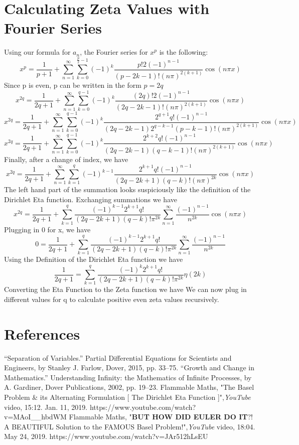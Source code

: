 \documentclass[12pt]{article}
\begin{document}
\section{Calculating Zeta Values with Fourier Series}
Using our formula for \(a_n\), the Fourier series for \(x^p\) is the following:
\[x^p=\frac{1}{p+1}+\sum_{n=1}^{\infty}\sum_{k=0}^{\frac{p}{2}-1}(-1)^k\frac{p!2(-1)^{n-1}}{(p-2k-1)!(n\pi)^{2(k+1)}}\cos(n\pi x)\]
Since p is even, p can be written in the form \(p=2q\)
\[x^{2q}=\frac{1}{2q+1}+\sum_{n=1}^{\infty}\sum_{k=0}^{q-1}(-1)^k\frac{(2q)!2(-1)^{n-1}}{(2q-2k-1)!(n\pi)^{2(k+1)}}\cos(n\pi x)\]
\[x^{2q}=\frac{1}{2q+1}+\sum_{n=1}^{\infty}\sum_{k=0}^{q-1}(-1)^k\frac{2^{q+1}q!(-1)^{n-1}}{(2q-2k-1)2^{q-k-1}(p-k-1)!(n\pi)^{2(k+1)}}\cos(n\pi x)\]
\[x^{2q}=\frac{1}{2q+1}+\sum_{n=1}^{\infty}\sum_{k=0}^{q-1}(-1)^k\frac{2^{k+2}q!(-1)^{n-1}}{(2q-2k-1)(q-k-1)!(n\pi)^{2(k+1)}}\cos(n\pi x)\]
Finally, after a change of index, we have
\[{x^{2q}=\frac{1}{2q+1}+\sum_{n=1}^{\infty}\sum_{k=1}^q(-1)^{k-1}\frac{2^{k+1}q!(-1)^{n-1}}{(2q-2k+1)(q-k)!(n\pi)^{2k}}\cos(n\pi x)}\]
The left hand part of the summation looks suspiciously like the definition of the Dirichlet Eta function.
Exchanging summations we have
\[x^{2q}=\frac{1}{2q+1}+\sum_{k=1}^q\frac{(-1)^{k-1}2^{k+1}q!}{(2q-2k+1)(q-k)!\pi^{2k}}\sum_{n=1}^{\infty}\frac{(-1)^{n-1}}{n^{2k}}\cos(n\pi x)\]
Plugging in 0 for x, we have
\[0=\frac{1}{2q+1}+\sum_{k=1}^q\frac{(-1)^{k-1}2^{k+1}q!}{(2q-2k+1)(q-k)!\pi^{2k}}\sum_{n=1}^{\infty}\frac{(-1)^{n-1}}{n^{2k}}\]
Using the Definition of the Dirichlet Eta function we have
\[\frac{1}{2q+1}=\sum_{k=1}^q\frac{(-1)^{k}2^{k+1}q!}{(2q-2k+1)(q-k)!\pi^{2k}}\eta(2k)\]
Converting the Eta Function to the Zeta function we have
\newline
{} \newline
\newline
We can now plug in different values for q to calculate positive even zeta values recursively.
\newpage
\section{References}
“Separation of Variables.” Partial Differential Equations for Scientists and Engineers, by Stanley J. Farlow, Dover, 2015, pp. 33–75.
\newline
\newline“Growth and Change in Mathematics.” Understanding Infinity: the Mathematics of Infinite Processes, by A. Gardiner, Dover Publications, 2002, pp. 19–23.
\newline
\newline
Flammable Maths, "The Basel Problem \& its Alternating Formulation [ The Dirichlet Eta Function ]",\textit{YouTube} video, 15:12. Jan. 11, 2019. \newline
https://www.youtube.com/watch?v=MAoI\_\_hbdWM
\newline
\newline
Flammable Maths, "\textbf{BUT HOW DID EULER DO IT}?! A BEAUTIFUL Solution to the FAMOUS Basel Problem!",\textit{YouTube} video, 18:04. May 24, 2019. https://www.youtube.com/watch?v=JAr512hLsEU
\end{document}

